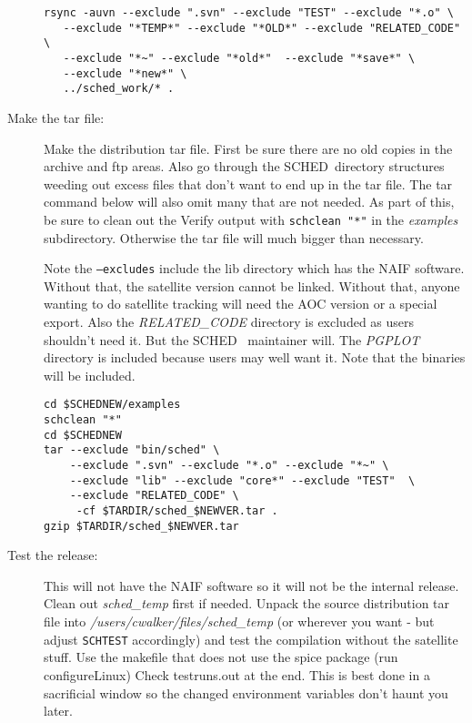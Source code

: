 \documentclass{report}
\newcommand{\schedb}{{\sc SCHED~}}
\begin{document}
\begin{description}
\begin{verbatim}
rsync -auvn --exclude ".svn" --exclude "TEST" --exclude "*.o" \
   --exclude "*TEMP*" --exclude "*OLD*" --exclude "RELATED_CODE" \
   --exclude "*~" --exclude "*old*"  --exclude "*save*" \
   --exclude "*new*" \
   ../sched_work/* .
\end{verbatim}


\item [Make the tar file:]

Make the distribution tar file.  First be sure there are no old copies
in the archive and ftp areas.  Also go through the \schedb directory
structures weeding out excess files that don't want to end up in the
tar file.  The tar command below will also omit many that are not
needed.  As part of this, be sure to clean out the Verify output
with {\tt schclean "*"} in the {\sl examples} subdirectory.  Otherwise
the tar file will much bigger than necessary.

Note the {\tt --excludes} include the lib directory which has the NAIF
software.  Without that, the satellite version cannot be linked.
Without that, anyone wanting to do satellite tracking will need the
AOC version or a special export.  Also the {\sl RELATED\_CODE}
directory is excluded as users shouldn't need it.  But the \schedb
maintainer will.  The {\sl PGPLOT} directory is included because users
may well want it.   Note that the binaries will be included.

\begin{verbatim}
cd $SCHEDNEW/examples
schclean "*"
cd $SCHEDNEW
tar --exclude "bin/sched" \
    --exclude ".svn" --exclude "*.o" --exclude "*~" \
    --exclude "lib" --exclude "core*" --exclude "TEST"  \
    --exclude "RELATED_CODE" \
     -cf $TARDIR/sched_$NEWVER.tar .
gzip $TARDIR/sched_$NEWVER.tar
\end{verbatim}


\item [Test the release:]

This will not have the NAIF software so it will not be the internal
release.  Clean out {\sl sched\_temp} first if needed.  Unpack the
source distribution tar file into {\sl
/users/cwalker/files/sched\_temp} (or wherever you want - but adjust
{\tt SCHTEST} accordingly) and test the compilation without the
satellite stuff.  Use the makefile that does not use the spice package
(run configureLinux) Check testruns.out at the end.  This is best done
in a sacrificial window so the changed environment variables don't
haunt you later.


\end{description}
\end{document}
